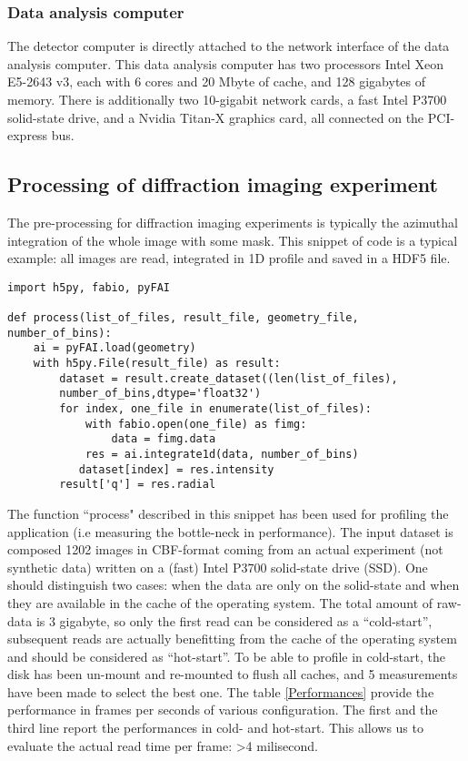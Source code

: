 \documentclass[preprint, pdf]{iucr}              %
\begin{document}
\subsubsection{Data analysis computer}

The detector computer is directly attached to the network interface of the data
analysis computer. 
This data analysis computer has two processors Intel Xeon E5-2643 v3, each with 
6 cores and  20 Mbyte of cache, and 128 gigabytes of memory. 
There is additionally two 10-gigabit network cards, a fast Intel P3700
solid-state drive, and a Nvidia Titan-X graphics card, all connected on the
PCI-express bus.

\subsection{Processing of diffraction imaging experiment}

The pre-processing for diffraction imaging experiments is typically the
azimuthal integration of the whole image with some mask. 
This snippet of code is a typical example: all images are read, integrated in 1D
profile and saved in a HDF5 file.

\label{sequential}
\begin{verbatim}
import h5py, fabio, pyFAI

def process(list_of_files, result_file, geometry_file, number_of_bins):
    ai = pyFAI.load(geometry)
    with h5py.File(result_file) as result:
        dataset = result.create_dataset((len(list_of_files),
        number_of_bins,dtype='float32') 
        for index, one_file in enumerate(list_of_files):
            with fabio.open(one_file) as fimg:
                data = fimg.data
            res = ai.integrate1d(data, number_of_bins)
           dataset[index] = res.intensity
        result['q'] = res.radial
\end{verbatim}

The function ``process" described in this snippet has been used for
profiling the application (i.e measuring the bottle-neck in performance). 
The input dataset is composed 1202 images in CBF-format coming from an actual
experiment (not synthetic data) written on a (fast) Intel P3700 solid-state
drive (SSD).
One should distinguish two cases: when the data are only on the
solid-state and when they are available in the cache of the
operating system.
The total amount of raw-data is 3 gigabyte, so only the first read can be
considered as a ``cold-start'', subsequent reads are actually benefitting from
the cache of the operating system and should be considered as ``hot-start''.
To be able to profile in cold-start, the disk has been un-mount and re-mounted
to flush all caches, and 5 measurements have been made to select the best one.
The table \ref{Performances} provide the performance in
frames per seconds of various configuration. 
The first and the third line report the performances in cold- and hot-start.
This allows us to evaluate the actual read time per frame: >4 milisecond.
\end{document}
